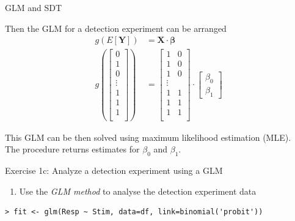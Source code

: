 \documentclass[10pt]{beamer}
\begin{document}
%
\begin{frame}{GLM and SDT}

Then the GLM for a detection experiment can be arranged
\begin{align*}
g(E[\mathbf{Y}]) &= \mathbf{X} \cdot \mathbf{\beta}\\
    g( 
    \begin{bmatrix}
           0 \\
           1 \\
           0 \\
           \vdots \\
           1 \\
           1 \\
           1 \\
    \end{bmatrix} ) &= 
    \begin{bmatrix}
           1 & 0 \\
           1 & 0 \\
           1 & 0 \\
           \vdots \\
           1 & 1 \\
           1 & 1 \\
           1 & 1 \\
    \end{bmatrix} \cdot
    \begin{bmatrix}
           \beta_0 \\
           \beta_1 
    \end{bmatrix}
\end{align*}

This GLM can be then solved using maximum likelihood estimation (MLE).\\
The procedure returns estimates for $\beta_0$ and $\beta_1$.\\


\end{frame}


\begin{frame}[fragile]{Exercise 1c: Analyze a detection experiment using a GLM}
\begin{enumerate}
\item Use the \textit{GLM method} to analyse the detection experiment data\\
\end{enumerate}

\pause
\begin{verbatim}
> fit <- glm(Resp ~ Stim, data=df, link=binomial('probit'))
\end{verbatim}
\end{frame}
\end{document}
